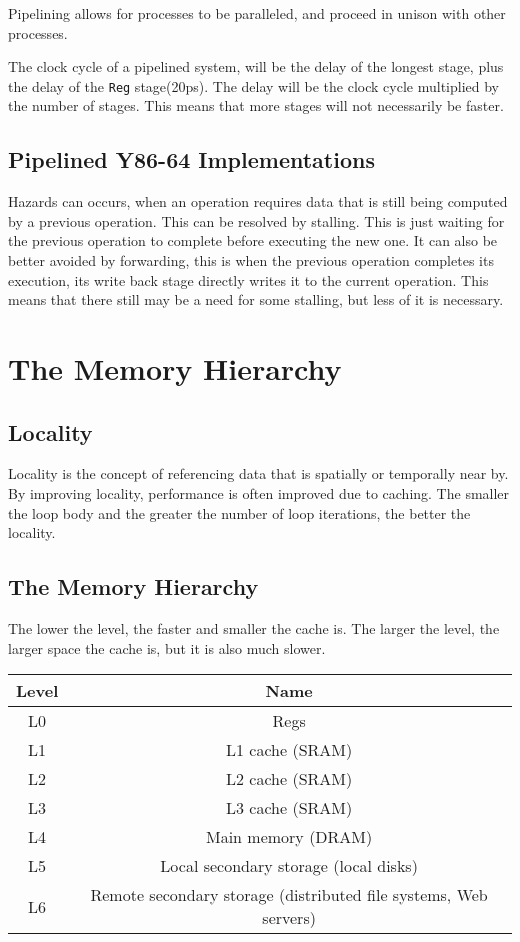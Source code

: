 \documentclass[10pt]{armath}
\newcommand{\s}[1]{\texttt{#1}}
\begin{document}
Pipelining allows for processes to be paralleled, and proceed in unison with
other processes.

The clock cycle of a pipelined system, will be the delay of the longest stage,
plus the delay of the \s{Reg} stage(20ps). The delay will be the clock cycle
multiplied by the number of stages. This means that more stages will not
necessarily be faster.

\subsection{Pipelined Y86-64 Implementations}%
\label{sub:pipelined_y86_64_implementations}

Hazards can occurs, when an operation requires data that is still being
computed by a previous operation. This can be resolved by stalling. This is
just waiting for the previous operation to complete before executing the new
one. It can also be better avoided by forwarding, this is when the previous
operation completes its execution, its write back stage directly writes it to
the current operation. This means that there still may be a need for some
stalling, but less of it is necessary.

\section{The Memory Hierarchy}%
\label{sec:the_memory_hierarchy}

\subsection{Locality}%
\label{sub:locality}

Locality is the concept of referencing data that is spatially or temporally near
by. By improving locality, performance is often improved due to caching. The
smaller the loop body and the greater the number of loop iterations, the better
the locality.

\subsection{The Memory Hierarchy}%
\label{sub:the_memory_hierarchy}

The lower the level, the faster and smaller the cache is. The larger the level,
the larger space the cache is, but it is also much slower.

\begin{center}
  \begin{tabular}{c c}
  Level & Name\\\hline
  L0 & Regs\\
  L1 & L1 cache (SRAM)\\
  L2 & L2 cache (SRAM)\\
  L3 & L3 cache (SRAM)\\
  L4 & Main memory (DRAM)\\
  L5 & Local secondary storage (local disks)\\
  L6 & Remote secondary storage (distributed file systems, Web servers)\\\hline
  \end{tabular}
\end{center}
\end{document}

